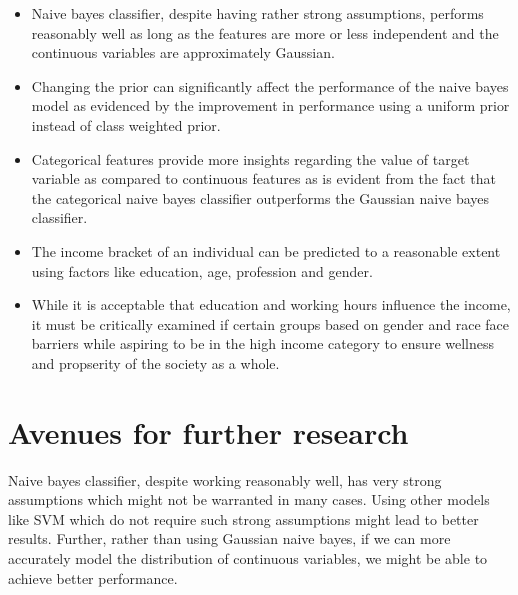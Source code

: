 \documentclass[conference]{IEEEtran}
\begin{document}
\begin{itemize}
    \item Naive bayes classifier, despite having rather strong assumptions, performs reasonably well as long as the features are more or less independent and the continuous variables are approximately Gaussian.
    \item Changing the prior can significantly affect the performance of the naive bayes model as evidenced by the improvement in performance using a uniform prior instead of class weighted prior.
    \item Categorical features provide more insights regarding the value of target variable as compared to continuous features as is evident from the fact that the categorical naive bayes classifier outperforms the Gaussian naive bayes classifier.
    \item The income bracket of an individual can be predicted to a reasonable extent using factors like education, age, profession and gender.
    \item While it is acceptable that education and working hours influence the income, it must be critically examined if certain groups based on gender and race face barriers while aspiring to be in the high income category to ensure wellness and propserity of the society as a whole.
\end{itemize}



\section{Avenues for further research}

Naive bayes classifier, despite working reasonably well, has very strong assumptions which might not be warranted in many cases. Using other models like SVM which do not require such strong assumptions might lead to better results. Further, rather than using Gaussian naive bayes, if we can more accurately model the distribution of continuous variables, we might be able to achieve better performance.



\nocite{*} %

\end{document}
